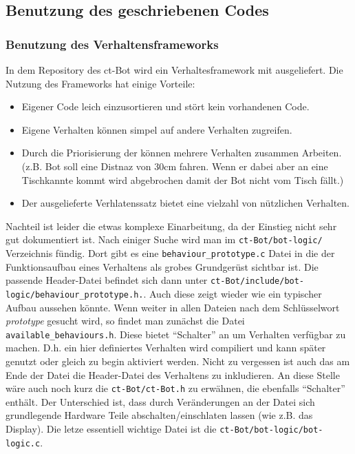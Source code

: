 \subsection{Benutzung des geschriebenen Codes}

\subsubsection{Benutzung des Verhaltensframeworks}
\label{benutzung_verhaltensframework}
In dem Repository des ct-Bot wird ein Verhaltesframework mit ausgeliefert.
Die Nutzung des Frameworks hat einige Vorteile:
\begin{itemize}
	\item Eigener Code leich einzusortieren und stört kein vorhandenen Code.
	\item Eigene Verhalten können simpel auf andere Verhalten zugreifen.
	\item Durch die Priorisierung der können mehrere Verhalten zusammen Arbeiten.
		(z.B. Bot soll eine Distnaz von 30cm fahren. Wenn er dabei aber an eine
		Tischkannte kommt wird abgebrochen damit der Bot nicht vom Tisch fällt.)
	\item Der ausgelieferte Verhlatenssatz bietet eine vielzahl von nützlichen
		Verhalten.
\end{itemize}
Nachteil ist leider die etwas komplexe Einarbeitung, da der Einstieg nicht sehr gut
dokumentiert ist. Nach einiger Suche wird man im \verb+ct-Bot/bot-logic/+ 
Verzeichnis fündig. Dort gibt es eine \verb+behaviour_prototype.c+ Datei
in die der Funktionsaufbau eines Verhaltens als grobes Grundgerüst sichtbar ist.
Die passende Header-Datei befindet sich dann unter
\verb+ct-Bot/include/bot-logic/behaviour_prototype.h.+. Auch diese
zeigt wieder wie ein typischer Aufbau aussehen könnte. Wenn weiter in allen Dateien
nach dem Schlüsselwort \textit{prototype} gesucht wird, so findet man zunächst
die Datei \\ \verb+available_behaviours.h+. Diese bietet "`Schalter"'
an um Verhalten verfügbar zu machen. D.h. ein hier definiertes Verhalten
wird compiliert und kann später genutzt oder gleich zu begin aktiviert werden.
Nicht zu vergessen ist auch das am Ende der Datei die Header-Datei des
Verhaltens zu inkludieren. An diese Stelle wäre auch noch kurz die
\verb+ct-Bot/ct-Bot.h+ zu erwähnen, die ebenfalls "`Schalter"' enthält.
Der Unterschied ist, dass durch Veränderungen an der Datei sich grundlegende
Hardware Teile abschalten/einschlaten lassen (wie z.B. das Display).
Die letze essentiell wichtige Datei ist die \verb+ct-Bot/bot-logic/bot-logic.c+.
